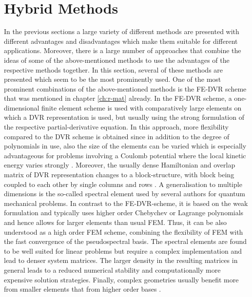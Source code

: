 {\section{Hybrid Methods}
In the previous sections a large variety of different methods are presented with different advantages and disadvantages which make them suitable for different applications.
Moreover, there is a large number of approaches that combine the ideas of some of the above-mentioned methods to use the advantages of the respective methods together.
In this section, several of these methods are presented which seem to be the most prominently used.
One of the most prominent combinations of the above-mentioned methods is the FE-DVR scheme \cite{impLDVR,taoDVR} that was mentioned in chapter \ref{ch:r-mat} already.
In the FE-DVR scheme, a one-dimensional finite element scheme is used with comparatively large elements on which a DVR representation is used, but usually using the strong formulation of the respective partial-derivative equation.
In this approach, more flexibility compared to the DVR scheme is obtained since in addition to the degree of polynomials in use, also the size of the elements can be varied which is especially advantageous for problems involving a Coulomb potential where the local kinetic energy varies strongly \cite{yipDVR}.
Moreover, the usually dense Hamiltonian and overlap matrix of DVR representation changes to a block-structure, with block being coupled to each other by single columns and rows \cite{taoDVR}.
A generalisation to multiple dimensions is the so-called spectral element used by several authors \cite{sem1,sem2,sem3} for quantum mechanical problems.
In contrast to the FE-DVR-scheme, it is based on the weak formulation and typically uses higher order Chebychev or Lagrange polynomials \cite{sem1} and hence allows for larger elements than usual FEM.
Thus, it can be also understood as a high order FEM scheme, combining the flexibility of FEM with the fast convergence of the pseudospectral basis.
The spectral elements are found to be well suited for linear problems but require a complex implementation and lead to denser system matrices.
The larger density in the resulting matrices in general leads to a reduced numerical stability and computationally more expensive solution strategies.
Finally, complex geometries usually benefit more from smaller elements that from higher order bases \cite{hf_dreyer}.

}
